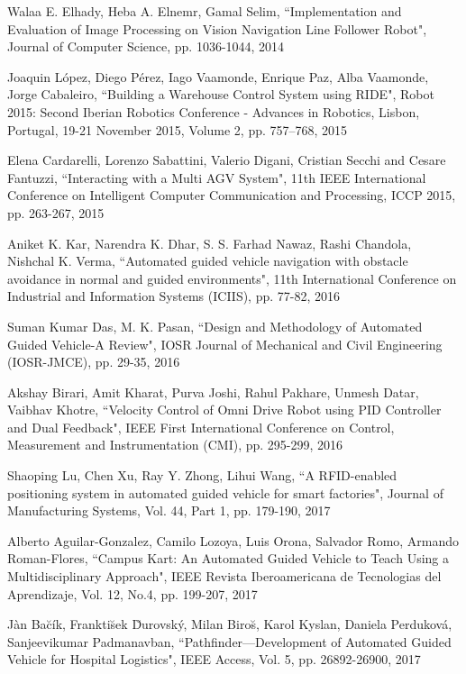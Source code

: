 \begin{thebibliography}{}
 Walaa E. Elhady, Heba A. Elnemr, Gamal Selim, ``Implementation and Evaluation of Image Processing on Vision Navigation Line Follower Robot", Journal of Computer Science, pp. 1036-1044, 2014

 Joaquin L\'{o}pez, Diego P\'{e}rez, Iago Vaamonde, Enrique Paz, Alba Vaamonde, Jorge Cabaleiro, ``Building a Warehouse Control System using RIDE", Robot 2015: Second Iberian Robotics Conference - Advances in Robotics, Lisbon, Portugal, 19-21 November 2015, Volume 2, pp. 757–768, 2015

 Elena Cardarelli, Lorenzo Sabattini, Valerio Digani, Cristian Secchi and Cesare Fantuzzi, ``Interacting with a Multi AGV System", 11th IEEE International Conference on
Intelligent Computer Communication and Processing, ICCP 2015, pp. 263-267, 2015

 Aniket K. Kar, Narendra K. Dhar, S. S. Farhad Nawaz, Rashi Chandola, Nishchal K. Verma, ``Automated guided vehicle navigation with obstacle avoidance in normal and guided environments", 11th International Conference on Industrial and Information Systems (ICIIS), pp. 77-82, 2016

 Suman Kumar Das, M. K. Pasan, ``Design and Methodology of Automated Guided Vehicle-A Review", IOSR Journal of Mechanical and Civil Engineering (IOSR-JMCE), pp. 29-35, 2016

 Akshay Birari, Amit Kharat, Purva Joshi, Rahul Pakhare, Unmesh Datar, Vaibhav Khotre, ``Velocity Control of Omni Drive Robot using PID Controller and Dual Feedback", IEEE First International Conference on Control, Measurement and Instrumentation (CMI), pp. 295-299, 2016

 Shaoping Lu, Chen Xu, Ray Y. Zhong, Lihui Wang, ``A RFID-enabled positioning system in automated guided vehicle for smart factories", Journal of Manufacturing Systems, Vol. 44, Part 1, pp. 179-190, 2017

 Alberto Aguilar-Gonzalez, Camilo Lozoya, Luis Orona,  Salvador Romo, Armando Roman-Flores, ``Campus Kart: An Automated Guided Vehicle to Teach Using a Multidisciplinary Approach", IEEE Revista Iberoamericana de Tecnologias del Aprendizaje, Vol. 12, No.4, pp. 199-207, 2017

 J\`{a}n Ba\u{c}\'{i}k, Frankti\u{s}ek \u{D}urovsk\'{y}, Milan Biro\u{s}, Karol Kyslan, Daniela  Perdukov\'{a}, Sanjeevikumar Padmanavban, ``Pathfinder—Development of Automated Guided Vehicle for Hospital Logistics", IEEE Access, Vol. 5, pp. 26892-26900, 2017



\end{thebibliography}
